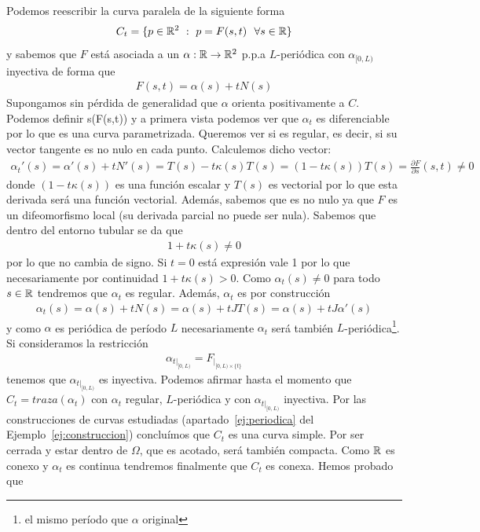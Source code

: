 \begin{ejercicio}
    \begin{solucion}
        Podemos reescribir la curva paralela de la siguiente forma
        \begin{gather*}
            C_t = \{p\in \mathbb{R}^2 \ : \ p=F(s, t) \ \ \forall s \in \mathbb{R}\}
        \end{gather*}
        y sabemos que $F$ está asociada a un $\alpha:\mathbb{R} \to \mathbb{R}^2$ p.p.a $L$-periódica con $\alpha_{[0,L)}$ inyectiva de forma que 
        \begin{gather*}
            F(s,t) = \alpha(s) + tN(s)
        \end{gather*}
        Supongamos sin pérdida de generalidad que $\alpha$ orienta positivamente a $C$. Podemos definir
             {s}{(F(s,t))}
        y a primera vista podemos ver que $\alpha_t$ es diferenciable por lo que es una curva parametrizada. Queremos ver si es regular, es decir, si su vector tangente es no nulo en cada punto. Calculemos dicho vector:
        \begin{gather*}
            \alpha_t'(s) = \alpha'(s) + tN'(s) = T(s) - t\kappa(s)T(s) = (1-t\kappa(s)) T(s) = \frac{\partial F}{\partial s}(s,t) \neq 0
        \end{gather*}
        donde $(1-t\kappa(s))$ es una función escalar y $T(s)$ es vectorial por lo que esta derivada será una función vectorial. Además, sabemos que es no nulo ya que $F$ es un difeomorfismo local (su derivada parcial no puede ser nula). Sabemos que dentro del entorno tubular se da que 
        \begin{gather*}
            1+ t \kappa(s) \neq 0
        \end{gather*}
        por lo que no cambia de signo. Si $t=0$ está expresión vale 1 por lo que necesariamente por continuidad $1 +t\kappa(s) > 0$. Como $\alpha_t(s) \neq 0$ para todo $s\in \mathbb{R}$ tendremos que $\alpha_t$ es regular. Además, $\alpha_t$ es por construcción 
        \begin{gather*}
            \alpha_t(s) = \alpha(s) + tN(s) = \alpha(s) + tJ T(s) = \alpha(s) + tJ\alpha'(s)
        \end{gather*}
        y como $\alpha$ es periódica de período $L$ necesariamente $\alpha_t$ será también $L$-periódica\footnote{el mismo período que $\alpha$ original}. Si consideramos la restricción
        \begin{gather*}
            \alpha_{t|_{[0,L)}} = F_{|_{[0,L)\times \{t\}}}
        \end{gather*}
        tenemos que $\alpha_{t|_{[0,L)}}$ es inyectiva. Podemos afirmar hasta el momento que $C_t=traza(\alpha_t)$ con $\alpha_t$ regular, $L$-periódica y con $\alpha_{t|_{[0,L)}}$ inyectiva. Por las construcciones de curvas estudiadas (apartado~\ref{ej:periodica} del Ejemplo~\ref{ej:construccion}) concluímos que $C_t$ es una curva simple. Por ser cerrada y estar dentro de $\Omega$, que es acotado, será también compacta. Como $\mathbb{R}$ es conexo y $\alpha_t$ es continua tendremos finalmente que $C_t$ es conexa. Hemos probado que 

\end{solucion}
\end{ejercicio}

